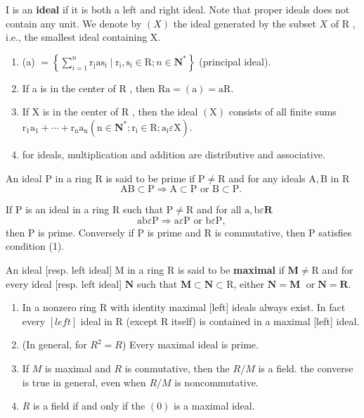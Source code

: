 I is an \textbf{ideal} if it is both a left and right ideal. Note that proper ideals does not contain any unit. We denote by $(X)$ the ideal generated by the subset $X$ of R , i.e., the smallest ideal containing X.
\begin{theo}
    \begin{enumerate}
        \item (a) $=\left\{\sum_{i=1}^n \mathrm{r}_{\mathrm{j}} \mathrm{as}_{\mathrm{i}} \mid \mathrm{r}_{\mathrm{i}}, \mathrm{s}_{\mathrm{i}} \in \mathrm{R} ; n \in \mathbf{N}^*\right\}$ (principal ideal).
        \item If a is in the center of R , then $\mathrm{Ra}=(\mathrm{a})=\mathrm{aR}$.
        \item If X is in the center of R , then the ideal $(\mathrm{X})$ consists of all finite sums $\mathrm{r}_1 \mathrm{a}_1+\cdots+\mathrm{r}_{\mathrm{n}} \mathrm{a}_{\mathrm{n}}\left(\mathrm{n} \in \mathbf{N}^* ; \mathrm{r}_{\mathrm{i}} \in \mathrm{R} ; \mathrm{a}_{\mathrm{i}} \varepsilon \mathrm{X}\right)$.
        \item for ideals, multiplication and addition are distributive and associative.
    \end{enumerate}
\end{theo}


An ideal P in a ring R is said to be prime if $\mathrm{P} \neq \mathrm{R}$ and for any ideals $\mathrm{A}, \mathrm{B}$ in R
$$
\mathrm{AB} \subset \mathrm{P} \Rightarrow \mathrm{A} \subset \mathrm{P} \text { or } \mathrm{B} \subset \mathrm{P} \text {. }
$$
\begin{theo}
If P is an ideal in a ring R such that $\mathrm{P} \neq \mathrm{R}$ and for all $\mathrm{a}, \mathrm{b} \varepsilon \mathbf{R}$
$$
\mathrm{ab} \varepsilon \mathrm{P} \Rightarrow \mathrm{a} \varepsilon \mathrm{P} \text { or } \mathrm{b} \varepsilon \mathrm{P} \text {, }
$$
then P is prime. Conversely if P is prime and R is commutative, then P satisfies condition (1).
\end{theo}

An ideal [resp. left ideal] M in a ring R is said to be \textbf{maximal} if $\mathbf{M} \neq \mathrm{R}$ and for every ideal [resp. left ideal] $\mathbf{N}$ such that $\mathbf{M} \subset \mathbf{N} \subset \mathrm{R}$, either $\mathbf{N}=\mathbf{M}$ $\operatorname{or} \mathbf{N}=\mathbf{R}$.

\begin{theo}
    \begin{enumerate}
        \item In a nonzero ring R with identity maximal [left] ideals always exist. In fact every $[l e f t]$ ideal in R (except R itself) is contained in a maximal [left] ideal.
        \item (In general, for $R^2 = R$) Every maximal ideal is prime. 
        \item If $M$ is maximal and $R$ is conmutative, then the $R/M$ is a field. the converse is true in general, even when $R/M$ is noncommutative.
        \item $R$ is a field if and only if the $(0)$ is a maximal ideal.
    \end{enumerate}
\end{theo}

